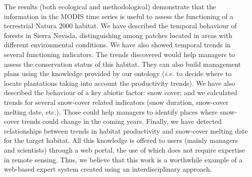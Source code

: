 The results (both ecological and methodological) demonstrate that the information in the MODIS time series is useful to assess the functioning of a terrestrial Natura 2000 habitat. We have described the temporal behaviour of \Qp forests in Sierra Nevada, distinguishing among patches located in areas with different environmental conditions. We have also showed temporal trends in several functioning indicators. The trends discovered would help managers to assess the conservation status of this habitat. They can also build management plans using the knowledge provided by our ontology (\emph{i.e.} to decide where to locate plantations taking into account the productivity trends). We have also described the behaviour of a key abiotic factor: snow cover; and we calculated trends for several snow-cover related indicators (snow duration, snow-cover melting date, etc.). Those could help managers to identify places where snow-cover trends could change in the coming years. Finally, we have detected relationships between trends in habitat productivity and snow-cover melting date for the target habitat. All this knowledge is offered to users (mainly managers and scientists) through a web portal, the use of which does not require expertise in remote sensing. Thus, we believe that this work is a worthwhile example of a web-based expert system created using an interdisciplinary approach.

